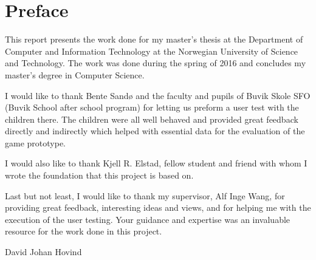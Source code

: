 \chapter*{Preface}
This report presents the work done for my master's thesis at the Department of Computer and Information Technology at the Norwegian University of Science and Technology. The work was done during the spring of 2016 and concludes my master's degree in Computer Science.

I would like to thank Bente Sandø and the faculty and pupils of Buvik Skole SFO (Buvik School after school program) for letting us preform a user test with the children there. The children were all well behaved and provided great feedback directly and indirectly which helped with essential data for the evaluation of the game prototype.

I would also like to thank Kjell R. Elstad, fellow student and friend with whom I wrote the foundation that this project is based on.

Last but not least, I would like to thank my supervisor, Alf Inge Wang, for providing great feedback, interesting ideas and views, and for helping me with the execution of the user testing. Your guidance and expertise was an invaluable resource for the work done in this project.

\vspace{2cm}
\begin{center}
David Johan Hovind
\end{center}